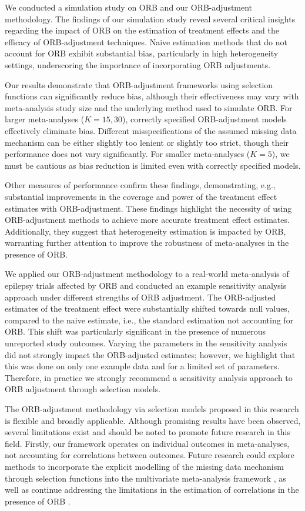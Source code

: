\documentclass[twocolumn]{article}\usepackage[]{graphicx}\usepackage[]{xcolor}
\begin{document}
We conducted a simulation study on ORB and our ORB-adjustment methodology. The findings of our simulation study reveal several critical insights regarding the impact of ORB on the estimation of treatment effects and the efficacy of ORB-adjustment techniques. Naive estimation methods that do not account for ORB exhibit substantial bias, particularly in high heterogeneity settings, underscoring the importance of incorporating ORB adjustments. 

Our results demonstrate that ORB-adjustment frameworks using selection functions can significantly reduce bias, although their effectiveness may vary with meta-analysis study size and the underlying method used to simulate ORB. For larger meta-analyses ($K= 15, 30$), correctly specified ORB-adjustment models effectively eliminate bias. Different misspecifications of the assumed missing data mechanism can be either slightly too lenient or slightly too strict, though their performance does not vary significantly. For smaller meta-analyses ($K=5$), we must be cautious as bias reduction is limited even with correctly specified models. 

Other measures of performance confirm these findings, demonstrating, e.g., substantial improvements in the coverage and power of the treatment effect estimates with ORB-adjustment. These findings highlight the necessity of using ORB-adjustment methods to achieve more accurate treatment effect estimates. Additionally, they suggest that heterogeneity estimation is impacted by ORB, warranting further attention to improve the robustness of meta-analyses in the presence of ORB. 

We applied our ORB-adjustment methodology to a real-world meta-analysis of epilepsy trials \citep{Copas2019, topiramate} affected by ORB and conducted an example sensitivity analysis approach under different strengths of ORB adjustment. The ORB-adjusted estimates of the treatment effect were substantially shifted towards null values, compared to the naive estimate, i.e., the standard estimation not accounting for ORB. This shift was particularly significant in the presence of numerous unreported study outcomes. Varying the parameters in the sensitivity analysis did not strongly impact the ORB-adjusted estimates; however, we highlight that this was done on only one example data and for a limited set of parameters. Therefore, in practice we strongly recommend a sensitivity analysis approach to ORB adjustment through selection models. 

The ORB-adjustment methodology via selection models proposed in this research is flexible and broadly applicable. Although promising results have been observed, several limitations exist and should be noted to promote future research in this field. Firstly, our framework operates on individual outcomes in meta-analyses, not accounting for correlations between outcomes. Future research could explore methods to incorporate the explicit modelling of the missing data mechanism through selection functions into the multivariate meta-analysis framework \citep{Liu2017, Hwang2018, Bay}, as well as continue addressing the limitations in the estimation of correlations in the presence of ORB \citep{Bay, Kirkham2012, Hwang2018, Liu2017}.
\end{document}
